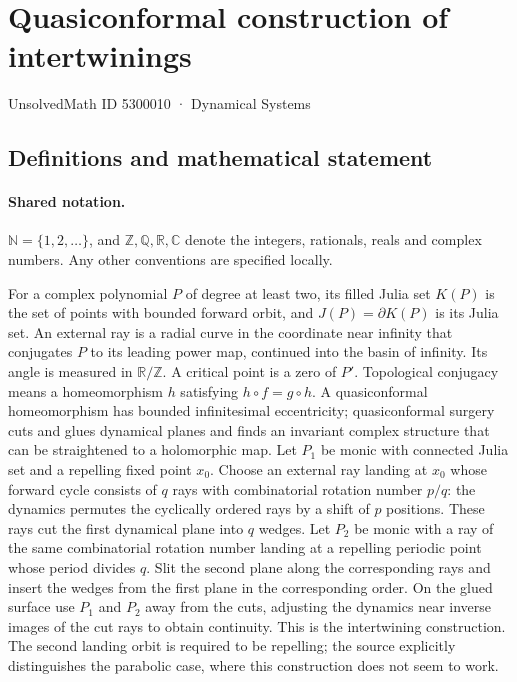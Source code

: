 \documentclass[11pt]{article}
\begin{document}
\setcounter{section}{5300009}
\section{Quasiconformal construction of intertwinings}\label{5300010}
{\small\sffamily UnsolvedMath ID 5300010 · Dynamical Systems}
\subsection{Definitions and mathematical statement}

\paragraph{Shared notation.}$\mathbb N=\{1,2,\ldots\}$, and $\mathbb Z,\mathbb Q,\mathbb R,\mathbb C$ denote the integers, rationals, reals and complex numbers. Any other conventions are specified locally.


For a complex polynomial $P$ of degree at least two, its filled Julia set $K(P)$ is the set of points with bounded forward orbit, and $J(P)=\partial K(P)$ is its Julia set. An external ray is a radial curve in the coordinate near infinity that conjugates $P$ to its leading power map, continued into the basin of infinity. Its angle is measured in $\mathbb R/\mathbb Z$. A critical point is a zero of $P'$. Topological conjugacy means a homeomorphism $h$ satisfying $h\circ f=g\circ h$. A quasiconformal homeomorphism has bounded infinitesimal eccentricity; quasiconformal surgery cuts and glues dynamical planes and finds an invariant complex structure that can be straightened to a holomorphic map.
Let $P_1$ be monic with connected Julia set and a repelling fixed point $x_0$. Choose an external ray landing at $x_0$ whose forward cycle consists of $q$ rays with combinatorial rotation number $p/q$: the dynamics permutes the cyclically ordered rays by a shift of $p$ positions. These rays cut the first dynamical plane into $q$ wedges. Let $P_2$ be monic with a ray of the same combinatorial rotation number landing at a repelling periodic point whose period divides $q$. Slit the second plane along the corresponding rays and insert the wedges from the first plane in the corresponding order. On the glued surface use $P_1$ and $P_2$ away from the cuts, adjusting the dynamics near inverse images of the cut rays to obtain continuity. This is the intertwining construction. The second landing orbit is required to be repelling; the source explicitly distinguishes the parabolic case, where this construction does not seem to work.
\end{document}

